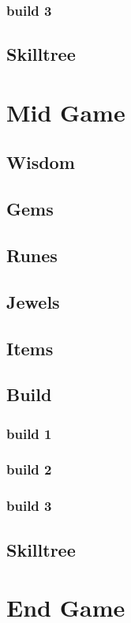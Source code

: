 \documentclass[12pt]{article}
\begin{document}
\subsubsection{build 3}

\subsection{Skilltree}


\newpage

\section{Mid Game}
\subsection{Wisdom}
\subsection{Gems}
\subsection{Runes}
\subsection{Jewels}
\subsection{Items}
\subsection{Build}
\subsubsection{build 1}
\subsubsection{build 2}
\subsubsection{build 3}
\subsection{Skilltree}

\newpage

\section{End Game}
\end{document}
